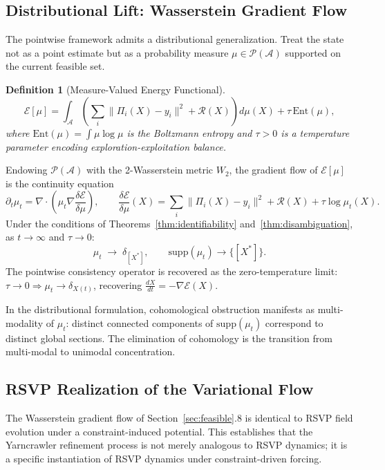\documentclass[12pt, oneside]{article}
\newtheorem{definition}[theorem]{Definition}
\begin{document}
\subsection{Distributional Lift: Wasserstein Gradient Flow}

The pointwise framework admits a distributional generalization. Treat the state not as a
point estimate but as a probability measure $\mu \in \mathcal{P}(\mathcal{A})$ supported
on the current feasible set.

\begin{definition}[Measure-Valued Energy Functional]
\[
\mathcal{E}[\mu] = \int_{\mathcal{A}} \left(
\sum_i \|\Pi_i(X) - y_i\|^2 + \mathcal{R}(X)
\right) d\mu(X) + \tau\, \mathrm{Ent}(\mu),
\]
where $\mathrm{Ent}(\mu) = \int \mu \log \mu$ is the Boltzmann entropy and $\tau > 0$
is a temperature parameter encoding exploration-exploitation balance.
\end{definition}

Endowing $\mathcal{P}(\mathcal{A})$ with the 2-Wasserstein metric $W_2$, the gradient
flow of $\mathcal{E}[\mu]$ is the continuity equation
\[
\partial_t \mu_t = \nabla \cdot \left(
\mu_t \nabla \frac{\delta \mathcal{E}}{\delta \mu}
\right),
\qquad
\frac{\delta \mathcal{E}}{\delta \mu}(X) =
\sum_i \|\Pi_i(X) - y_i\|^2 + \mathcal{R}(X) + \tau \log \mu_t(X).
\]
Under the conditions of Theorems~\ref{thm:identifiability} and~\ref{thm:disambiguation},
as $t \to \infty$ and $\tau \to 0$:
\[
\mu_t \;\longrightarrow\; \delta_{[X^*]}, \qquad \mathrm{supp}(\mu_t) \to \{[X^*]\}.
\]
The pointwise consistency operator is recovered as the zero-temperature limit:
$\tau \to 0 \Rightarrow \mu_t \to \delta_{X(t)}$, recovering
$\frac{dX}{dt} = -\nabla\mathcal{E}(X)$.

In the distributional formulation, cohomological obstruction manifests as multi-modality
of $\mu_t$: distinct connected components of $\mathrm{supp}(\mu_t)$ correspond to
distinct global sections. The elimination of cohomology is the transition from
multi-modal to unimodal concentration.

\subsection{RSVP Realization of the Variational Flow}

The Wasserstein gradient flow of Section~\ref{sec:feasible}.8 is identical to RSVP
field evolution under a constraint-induced potential. This establishes that the Yarncrawler
refinement process is not merely analogous to RSVP dynamics; it is a specific
instantiation of RSVP dynamics under constraint-driven forcing.
\end{document}
